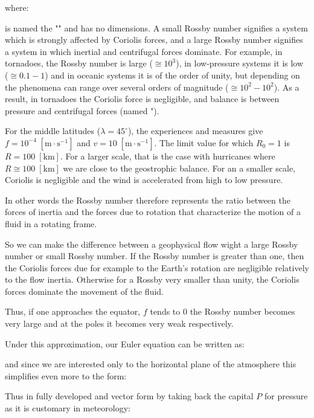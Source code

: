 	where:
	
	is named the "" and has no dimensions. A small Rossby number signifies a system which is strongly affected by Coriolis forces, and a large Rossby number signifies a system in which inertial and centrifugal forces dominate. For example, in tornadoes, the Rossby number is large ($\cong 10^3$), in low-pressure systems it is low ($\cong 0.1-1$) and in oceanic systems it is of the order of unity, but depending on the phenomena can range over several orders of magnitude ($\cong 10^2-10^2$). As a result, in tornadoes the Coriolis force is negligible, and balance is between pressure and centrifugal forces (named "). 
	\begin{tcolorbox}[title=Remark,colframe=black,arc=10pt]
	For the middle latitudes ($\lambda=45^\circ$), the experiences and measures give $f=10^{-4}\;[\text{m}\cdot\text{s}^{-1}]$ and $v=10\;[\text{m}\cdot \text{s}^{-1}]$. The limit value for which $R_0=1$ is $R=100\;[\text{km}]$. For a larger scale, that is the case with hurricanes where $R\cong 100\;[\text{km}]$ we are close to the geostrophic balance. For an  a smaller scale, Coriolis is negligible and the wind is accelerated from high to low pressure.
	\end{tcolorbox}
	In other words the Rossby number therefore represents the ratio between the forces of inertia and the forces due to rotation that characterize the motion of a fluid in a rotating frame.

	So we can make the difference between a geophysical flow wight a large Rossby number or small Rossby number. If the Rossby number is greater than one, then the Coriolis forces due for example to the Earth's rotation are negligible relatively to the flow inertia. Otherwise for a Rossby very smaller than unity, the Coriolis forces dominate the movement of the fluid.

	Thus, if one approaches the equator, $f$ tends to $0$ the Rossby number becomes very large and at the poles it becomes very weak respectively.

	Under this approximation, our Euler equation can be written as:
	
	and since we are interested only to the horizontal plane of the atmosphere this simplifies even more to the form:
	
	Thus in fully developed and vector form by taking back the capital $P$ for pressure as it is customary in meteorology:
	
